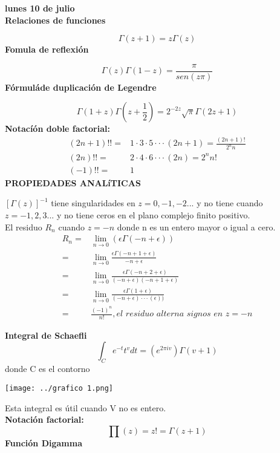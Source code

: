 \documentclass{article}
\theoremstyle{definition}
\begin{document}
\textbf{lunes 10 de julio}\\
\textbf{Relaciones de funciones}

\[\Gamma (z+1) = z\Gamma (z)\]
\textbf{Fomula de reflexión}

\[\Gamma (z)\Gamma (1-z) = \frac{\pi}{sen(z\pi)}\]
\textbf{Fórmuláde duplicación de Legendre}

\[\Gamma (1+z)\Gamma (z+\frac{1}{2}) = 2^{-2z}\sqrt{\pi}\Gamma (2z+1) \]
\textbf{Notacíón doble factorial: }
\[
\begin{array}{rl}
	(2n+1)!!=& 1\cdot 3\cdot 5\cdot\cdot\cdot (2n+1)=\frac{(2n+1)!}{2^nn}\\
	(2n)!!=& 2\cdot 4\cdot 6\cdot\cdot\cdot (2n)=2^nn!\\
	(-1)!!=& 1
\end{array}
\]
\textbf{PROPIEDADES ANALíTICAS}

$[\Gamma (z)]^{-1}$ tiene singularidades en $z=0,-1,-2...$ y no tiene cuando  $z=-1,2,3...$ y no tiene ceros en el plano complejo finito positivo.\\
El residuo $R_n$ cuando $z=-n$ donde n es un entero mayor o igual a cero.\\
\[
\begin{array}{rl}
	R_n=&\lim\limits_{n\to 0} (\epsilon\Gamma (-n+\epsilon))\\
	=& \lim\limits_{n\to 0} \frac{\epsilon\Gamma (-n+1+\epsilon)}{-n+\epsilon}\\
	=& \lim\limits_{n\to 0} \frac{\epsilon\Gamma (-n+2+\epsilon)}{(-n+\epsilon)(-n+1+\epsilon)}\\
	=&\lim\limits_{n\to 0} \frac{\epsilon\Gamma (1+\epsilon)}{(-n+\epsilon)\cdot\cdot\cdot(\epsilon))}\\
	=& \frac{(-1)^n}{n!}, \textit{el residuo alterna signos en } z=-n
\end{array}
\]

\textbf{Integral de Schaefli}
\[\int_Ce^{-t}t^vdt=(e^{2\pi iv})\Gamma (v+1)\]
donde C es el contorno
\begin{center}
\texttt{[image: ../grafico 1.png]} 
\end{center}

Esta integral es útil cuando V no es entero.\\
\textbf{Notación factorial:}
\[\prod (z)=z!=\Gamma (z+1)\]
\textbf{Función Digamma}
\end{document}
